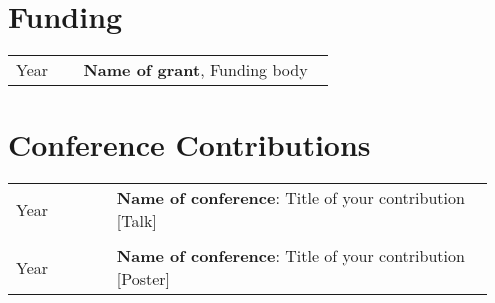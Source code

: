 \documentclass[11pt, a4paper, colorlinks=true, linkcolor=blue, citecolor=blue, urlcolor=blue]{article}
\begin{document}
\section*{Funding}
\begin{tabular}{p{0.2\linewidth} p{0.75\linewidth}}
Year & \textbf{Name of grant}, Funding body \\
\end{tabular}

\section*{Conference Contributions}
\begin{tabular}{p{0.2\linewidth} p{0.75\linewidth}}
Year & \textbf{Name of conference}: Title of your contribution [Talk] \\
&  \\
Year & \textbf{Name of conference}: Title of your contribution [Poster] \\
\end{tabular}
\end{document}
